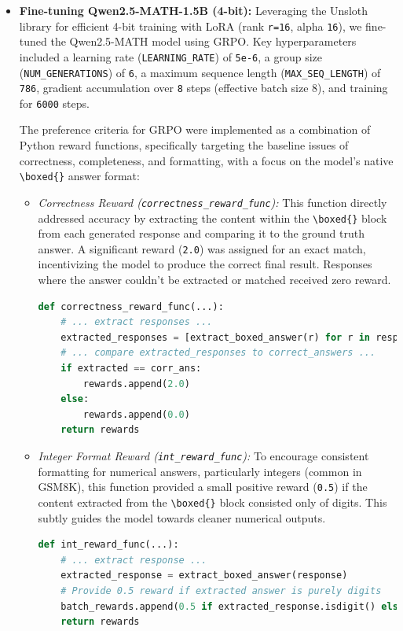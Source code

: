\documentclass[11pt]{article}
\begin{document}
\begin{itemize}
    \item \textbf{Fine-tuning Qwen2.5-MATH-1.5B (4-bit):}
    Leveraging the Unsloth library for efficient 4-bit training with LoRA (rank \texttt{r=16}, alpha \texttt{16}), we fine-tuned the Qwen2.5-MATH model using GRPO. Key hyperparameters included a learning rate (\texttt{LEARNING\_RATE}) of \texttt{5e-6}, a group size (\texttt{NUM\_GENERATIONS}) of \texttt{6}, a maximum sequence length (\texttt{MAX\_SEQ\_LENGTH}) of \texttt{786}, gradient accumulation over \texttt{8} steps (effective batch size 8), and training for \texttt{6000} steps.

    The preference criteria for GRPO were implemented as a combination of Python reward functions, specifically targeting the baseline issues of correctness, completeness, and formatting, with a focus on the model's native \verb|\boxed{}| answer format:

        \begin{itemize}
            \item \textit{Correctness Reward (\texttt{correctness\_reward\_func}):} This function directly addressed accuracy by extracting the content within the \verb|\boxed{}| block from each generated response and comparing it to the ground truth answer. A significant reward (\texttt{2.0}) was assigned for an exact match, incentivizing the model to produce the correct final result. Responses where the answer couldn't be extracted or matched received zero reward.

\begin{lstlisting}[language=Python, caption={Core logic for correctness reward (Qwen)}, label={lst:qwen_correct}]
def correctness_reward_func(...):
    # ... extract responses ...
    extracted_responses = [extract_boxed_answer(r) for r in responses]
    # ... compare extracted_responses to correct_answers ...
    if extracted == corr_ans:
        rewards.append(2.0)
    else:
        rewards.append(0.0)
    return rewards
\end{lstlisting}


            \item \textit{Integer Format Reward (\texttt{int\_reward\_func}):} To encourage consistent formatting for numerical answers, particularly integers (common in GSM8K), this function provided a small positive reward (\texttt{0.5}) if the content extracted from the \verb|\boxed{}| block consisted only of digits. This subtly guides the model towards cleaner numerical outputs.
\begin{lstlisting}[language=Python, caption={Core logic for correctness reward (Qwen)}, label={lst:qwen_correct}]
def int_reward_func(...):
    # ... extract response ...
    extracted_response = extract_boxed_answer(response)
    # Provide 0.5 reward if extracted answer is purely digits
    batch_rewards.append(0.5 if extracted_response.isdigit() else 0.0)
    return rewards
\end{lstlisting}


\end{itemize}
\end{itemize}
\end{document}
